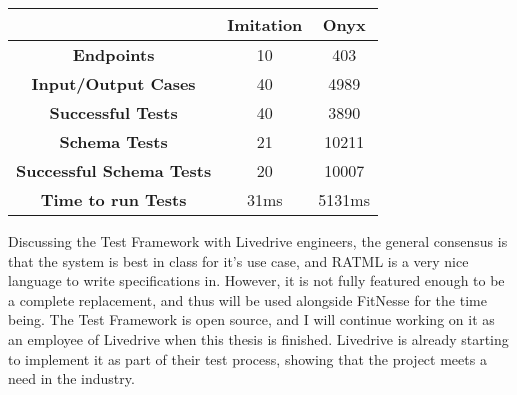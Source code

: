 \begin{tabular}{c | c | c}
& \textbf{Imitation} & \textbf{Onyx} \\ \hline
\textbf{Endpoints} & 10 & 403 \\ \hline
\textbf{Input/Output Cases} & 40 & 4989 \\
\textbf{Successful Tests} & 40 & 3890 \\ \hline
\textbf{Schema Tests} & 21 & 10211 \\
\textbf{Successful Schema Tests} & 20 & 10007 \\ \hline 
\textbf{Time to run Tests} & 31ms & 5131ms \\
\end{tabular}

Discussing the Test Framework with Livedrive engineers, the general consensus is that the system is best in class for it's use case, and RATML is a very nice language to write specifications in. However, it is not fully featured enough to be a complete replacement, and thus will be used alongside FitNesse for the time being. The Test Framework is open source, and I will continue working on it as an employee of Livedrive when this thesis is finished. Livedrive is already starting to implement it as part of their test process, showing that the project meets a need in the industry.